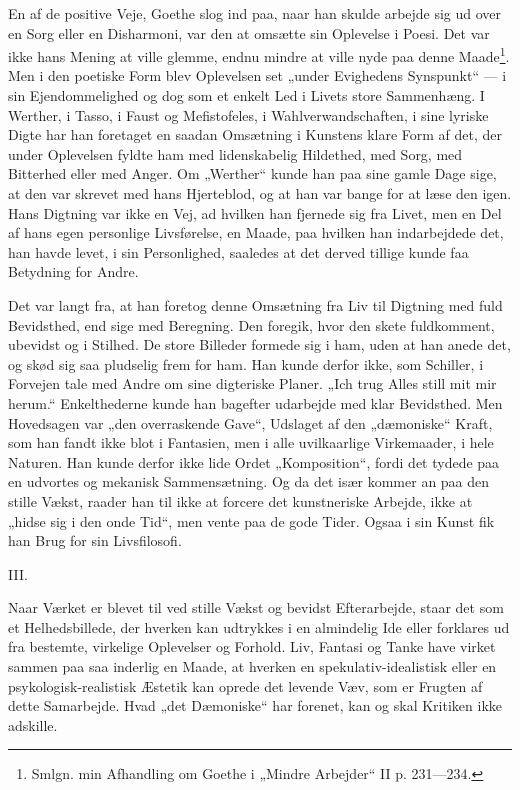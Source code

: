 \documentclass[12pt,a4paper,openany]{book}
\newcommand{\opage}[1]{\marginnote{\footnotesize\textit{[#1]}}}
\begin{document}
En af de positive Veje, Goethe slog ind paa, naar han
skulde arbejde sig ud over en Sorg eller en Disharmoni, var
den at omsætte sin Oplevelse i Poesi. Det var ikke hans
Mening at ville glemme, endnu mindre at ville nyde paa denne
\setcounter{footnote}{0}%
\opage{169}Maade\footnote[1]{Smlgn. min Afhandling om Goethe i „Mindre Arbejder“ II p. 231---234.}. Men i den poetiske Form blev Oplevelsen set „under
Evighedens Synspunkt“ --- i sin Ejendommelighed og dog
som et enkelt Led i Livets store Sammenhæng. I Werther, i
Tasso, i Faust og Mefistofeles, i Wahlverwandschaften, i sine
lyriske Digte har han foretaget en saadan Omsætning i Kunstens
klare Form af det, der under Oplevelsen fyldte ham med
lidenskabelig Hildethed, med Sorg, med Bitterhed eller med
Anger. Om „Werther“ kunde han paa sine gamle Dage sige,
at den var skrevet med hans Hjerteblod, og at han var bange
for at læse den igen. Hans Digtning var ikke en Vej, ad
hvilken han fjernede sig fra Livet, men en Del af hans egen
personlige Livsførelse, en Maade, paa hvilken han indarbejdede
det, han havde levet, i sin Personlighed, saaledes at det derved
tillige kunde faa Betydning for Andre.

Det var langt fra, at han foretog denne Omsætning fra Liv
til Digtning med fuld Bevidsthed, end sige med Beregning.
Den foregik, hvor den skete fuldkomment, ubevidst og i Stilhed.
De store Billeder formede sig i ham, uden at han anede
det, og skød sig saa pludselig frem for ham. Han kunde derfor
ikke, som Schiller, i Forvejen tale med Andre om sine
digteriske Planer. „Ich trug Alles still mit mir herum.“ Enkelthederne
kunde han bagefter udarbejde med klar Bevidsthed.
Men Hovedsagen var „den overraskende Gave“, Udslaget af
den „dæmoniske“ Kraft, som han fandt ikke blot i Fantasien,
men i alle uvilkaarlige Virkemaader, i hele Naturen. Han
kunde derfor ikke lide Ordet „Komposition“, fordi det tydede
paa en udvortes og mekanisk Sammensætning. Og da det især
kommer an paa den stille Vækst, raader han til ikke at forcere
det kunstneriske Arbejde, ikke at „hidse sig i den onde Tid“,
men vente paa de gode Tider. Ogsaa i sin Kunst fik han
Brug for sin Livsfilosofi.

\begin{center}III.\end{center}


Naar Værket er blevet til ved stille Vækst og bevidst
Efterarbejde, staar det som et Helhedsbillede, der hverken kan
\setcounter{footnote}{0}%
\opage{170}udtrykkes i en almindelig Ide eller forklares ud fra bestemte,
virkelige Oplevelser og Forhold. Liv, Fantasi og Tanke have
virket sammen paa saa inderlig en Maade, at hverken en spekulativ-idealistisk
eller en psykologisk-realistisk Æstetik kan
oprede det levende Væv, som er Frugten af dette Samarbejde.
Hvad „det Dæmoniske“ har forenet, kan og skal Kritiken ikke
adskille.
\end{document}
